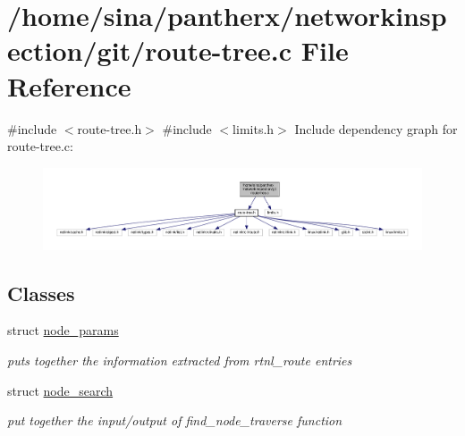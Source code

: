 \hypertarget{route-tree_8c}{}\section{/home/sina/pantherx/networkinspection/git/route-\/tree.c File Reference}
\label{route-tree_8c}
{\ttfamily \#include $<$route-\/tree.\+h$>$}\newline
{\ttfamily \#include $<$limits.\+h$>$}\newline
Include dependency graph for route-\/tree.c\+:\nopagebreak
\begin{figure}[H]
\begin{center}
\leavevmode
\includegraphics[width=350pt]{route-tree_8c__incl}
\end{center}
\end{figure}
\subsection*{Classes}
\begin{DoxyCompactItemize}
\item 
struct \hyperlink{structnode__params}{node\+\_\+params}
\begin{DoxyCompactList}\small\item\em puts together the information extracted from rtnl\+\_\+route entries \end{DoxyCompactList}\item 
struct \hyperlink{structnode__search}{node\+\_\+search}
\begin{DoxyCompactList}\small\item\em put together the input/output of find\+\_\+node\+\_\+traverse function \end{DoxyCompactList}\end{DoxyCompactItemize}
